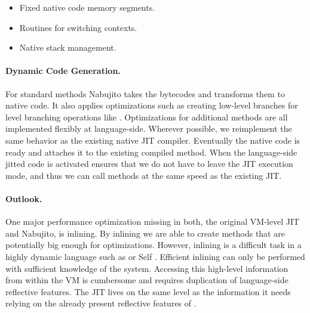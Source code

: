 \begin{itemize}
	\item Fixed native code memory segments.
	\item Routines for switching contexts.
	\item Native stack management.
\end{itemize}

\paragraph{Dynamic Code Generation.}
For standard methods Nabujito takes the bytecodes and transforms them to native code.
It also applies optimizations such as creating low-level branches for \ST level branching operations like .
Optimizations for additional methods are all implemented flexibly at language-side.
Wherever possible, we reimplement the same behavior as the existing native JIT compiler.
Eventually the native code is ready and \B attaches it to the existing compiled method.
When the language-side jitted code is activated \B ensures that we do not have to leave the JIT execution mode, and thus we can call methods at the same speed as the existing JIT.

\paragraph{Outlook.}
One major performance optimization missing in both, the original \PH VM-level JIT and Nabujito, is inlining. 
By inlining we are able to create methods that are potentially big enough for optimizations.
However, inlining is a difficult task in a highly dynamic language such as \ST or Self \cite{Cham89a}. 
Efficient inlining can only be performed with sufficient knowledge of the system. 
Accessing this high-level information from within the VM is cumbersome and requires duplication of language-side reflective features.
The JIT lives on the same level as the information it needs relying on the already present reflective features of \ST.


